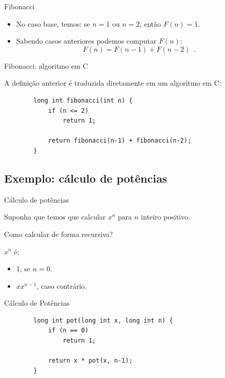 \documentclass[handout]{beamer}
\begin{document}
\begin{frame}[fragile]{Fibonacci}

    \begin{itemize}
        \item No caso base, temos: se $n = 1$ ou $n = 2$, então $F(n) = 1$.
        \item Sabendo casos anteriores podemos computar $F(n)$:
        $$ F(n) = F(n-1) + F(n-2) \enspace .$$
    \end{itemize}
\end{frame}

\begin{frame}[fragile]{Fibonacci: algoritmo em C}

    A definição anterior é traduzida diretamente em um algoritmo em C:
    \begin{verbatim}
        long int fibonacci(int n) {
            if (n <= 2)
                return 1;

            return fibonacci(n-1) + fibonacci(n-2);
        }
    \end{verbatim}
\end{frame}


\subsection{Exemplo: cálculo de potências}

\begin{frame}[fragile]{Cálculo de potências}

    Suponha que temos que calcular $x^n$ para $n$ inteiro positivo.

    Como calcular de forma recursiva?
    \pause

    $x^n$ é:
    \begin{itemize}
        \item 1, se $n=0$.
        \item $x x^{n-1}$, caso contrário.
    \end{itemize}
\end{frame}

\begin{frame}[fragile]{Cálculo de Potências}

    \begin{verbatim}
        long int pot(long int x, long int n) {
            if (n == 0)
                return 1;

            return x * pot(x, n-1);
        }
    \end{verbatim}
\end{frame}
\end{document}

